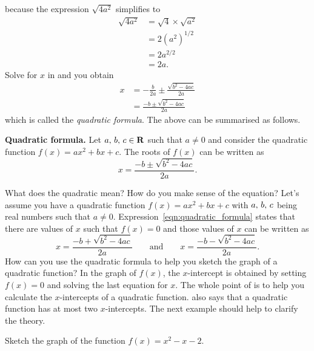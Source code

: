 \documentclass[a4paper,oneside,12pt]{article}
\begin{document}
because the expression $\sqrt{4a^2}$ simplifies to
\begin{align*}
\sqrt{4a^2}
&=
\sqrt{4} \times \sqrt{a^2} \\[4pt]
&=
2 (a^2)^{1/2} \\[4pt]
&=
2 a^{2/2} \\[4pt]
&=
2a.
\end{align*}
Solve for $x$ in
 and
you obtain
\begin{align*}
x
&=
-\frac{b}{2a}
\pm
\frac{
  \sqrt{b^2 - 4ac}
}{
  2a
} \\[4pt]
&=
\frac{
  -b \pm \sqrt{b^2 - 4ac}
}{
  2a
}
\end{align*}
which is called the \emph{quadratic formula}.  The above can be
summarised as follows.

\begin{theorem}
\label{thm:quadratic_formula}
\textbf{Quadratic formula.}
Let ${a},\, {b},\, {c} \in \mathbf{R}$ such that $a \neq 0$ and consider the
quadratic function $f(x) = ax^2 + bx + c$.  The roots of $f(x)$ can be
written as
\begin{equation}
\label{eqn:quadratic_formula}
x
=
\frac{
  -b \pm \sqrt{b^2 - 4ac}
}{
  2a
}.
\end{equation}
\end{theorem}

What does the quadratic  mean?  How do
you make sense of the equation?  Let's assume you have a quadratic
function $f(x) = ax^2 + bx + c$ with ${a},\, {b},\, {c}$ being real
numbers such that $a \neq 0$.
Expression~\eqref{eqn:quadratic_formula} states that there are values
of $x$ such that $f(x) = 0$ and those values of $x$ can be written as
\[
x
=
\frac{
  -b + \sqrt{b^2 - 4ac}
}{
  2a
}
\qquad
\text{and}
\qquad
x
=
\frac{
  -b - \sqrt{b^2 - 4ac}
}{
  2a
}.
\]
How can you use the quadratic formula to help you sketch the graph of
a quadratic function? In the graph of $f(x)$, the $x$-intercept is
obtained by setting $f(x) = 0$ and solving the last equation for $x$.
The whole point of  is to help you
calculate the $x$-intercepts of a quadratic function.
 also says that a quadratic function
has at most two $x$-intercepts.  The next example should help to
clarify the theory.

\begin{example}
Sketch the graph of the function $f(x) = x^2 - x - 2$.
\end{example}
\end{document}
